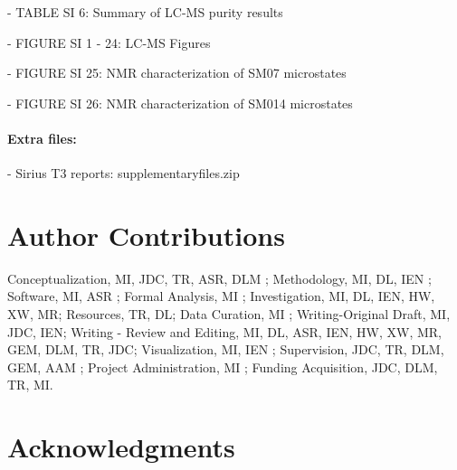 \documentclass[9pt,lineno]{elife}
\begin{document}
- TABLE SI 6: Summary of LC-MS purity results

- FIGURE SI 1 - 24:  LC-MS Figures  

- FIGURE SI 25: NMR characterization of SM07 microstates  

- FIGURE SI 26: NMR characterization of SM014 microstates  


\paragraph{Extra files:}  
- Sirius T3 reports: supplementary\textunderscore files.zip



\section{Author Contributions}

Conceptualization, MI, JDC, TR, ASR, DLM  ; Methodology, MI, DL, IEN ; Software, MI, ASR ; Formal Analysis, MI ; Investigation, MI, DL, IEN, HW, XW, MR; Resources, TR, DL;  Data Curation, MI ; Writing-Original Draft, MI, JDC, IEN; Writing - Review and Editing, MI, DL, ASR, IEN, HW, XW, MR, GEM, DLM, TR, JDC; Visualization, MI, IEN ; Supervision, JDC, TR, DLM, GEM, AAM ; Project Administration, MI ; Funding Acquisition, JDC, DLM, TR, MI. 


\section{Acknowledgments}
\end{document}
